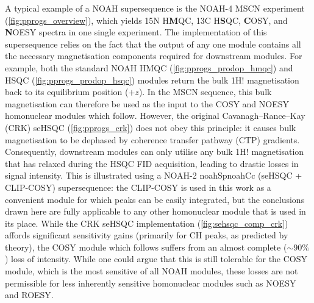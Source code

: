 \documentclass[11pt]{article}
\newcommand*{\noahtwo}[2]{\csname noah#1\endcsname\csname noah#2\endcsname}
\newcommand*{\carbon}{13C}
\newcommand*{\nitrogen}{15N}
\newcommand*{\magnnot}[1]{1H!#1}
\begin{document}
\begin{refsection}
A typical example of a NOAH supersequence is the NOAH-4 MSCN experiment (\cref{fig:pprogs_overview}), which yields \nitrogen{} H\textbf{M}QC, \carbon{} H\textbf{S}QC, \textbf{C}OSY, and \textbf{N}OESY spectra in one single experiment.\autocite{Kupce2017ACIE}
The implementation of this supersequence relies on the fact that the output of any one module contains all the necessary magnetisation components required for downstream modules.
For example, both the standard NOAH HMQC (\cref{fig:pprogs_prodop_hmqc})\autocite{Kupce2017ACIE, Kupce2007MRC} and HSQC (\cref{fig:pprogs_prodop_hsqc})\autocite{Kupce2017ACIE, Schulze-Sunninghausen2017JMR} modules return the bulk \magnnot{} magnetisation back to its equilibrium position ($+z$).
In the MSCN sequence, this bulk magnetisation can therefore be used as the input to the COSY and NOESY homonuclear modules which follow.
However, the original Cavanagh--Rance--Kay (CRK) seHSQC (\cref{fig:pprogs_crk}) does not obey this principle: it causes bulk magnetisation to be dephased by coherence transfer pathway (CTP) gradients.
Consequently, downstream modules can only utilise any bulk \magnnot{} magnetisation that has relaxed during the HSQC FID acquisition, leading to drastic losses in signal intensity.
This is illustrated using a NOAH-2 \noahtwo{Sp}{Cc} (seHSQC + CLIP-COSY\autocite{Koos2016ACIE}) supersequence: the CLIP-COSY is used in this work as a convenient module for which peaks can be easily integrated, but the conclusions drawn here are fully applicable to any other homonuclear module that is used in its place.
While the CRK seHSQC implementation (\cref{fig:sehsqc_comp_crk}) affords significant sensitivity gains (primarily for CH peaks, as predicted by theory\autocite{sehsqc_sens}), the COSY module which follows suffers from an almost complete ($\sim 90\%$) loss of intensity.
While one could argue that this is still tolerable for the COSY module, which is the most sensitive of all NOAH modules, these losses are not permissible for less inherently sensitive homonuclear modules such as NOESY and ROESY.


\end{refsection}
\end{document}
